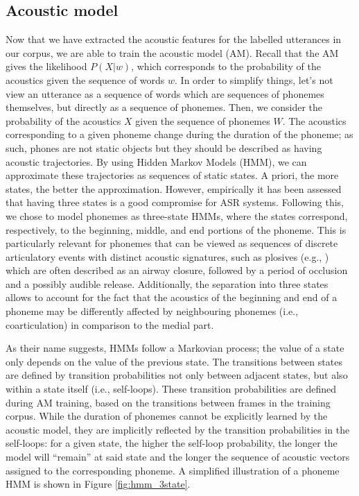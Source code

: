 \subsection{Acoustic model}

Now that we have extracted the acoustic features for the labelled utterances in our corpus, we are able to train the acoustic model (AM). Recall that the AM gives the likelihood $P(X|w)$, which corresponds to the probability of the acoustics given the sequence of words $w$.
In order to simplify things, let's not view an utterance as a sequence of words which are sequences of phonemes themselves, but directly as a sequence of phonemes. Then, we consider the probability of the acoustics $X$ given the sequence of phonemes $W$.
The acoustics corresponding to a given phoneme change during the duration of the phoneme; as such, phones are not static objects but they should be described as having acoustic trajectories. By using Hidden Markov Models (HMM), we can approximate these trajectories as sequences of static states. A priori, the more states, the better the approximation. However, empirically it has been assessed that having three states is a good compromise for ASR systems. Following this, we chose to model phonemes as three-state HMMs, where the states correspond, respectively, to the beginning, middle, and end portions of the phoneme. This is particularly relevant for phonemes that can be viewed as sequences of discrete articulatory events with distinct acoustic signatures, such as plosives (e.g., ) which are often described as an airway closure, followed by a period of occlusion and a possibly audible release. Additionally, the separation into three states allows to account for the fact that the acoustics of the beginning and end of a phoneme may be differently affected by neighbouring phonemes (i.e., coarticulation) in comparison to the medial part. 

As their name suggests, HMMs follow a Markovian process; the value of a state only depends on the value of the previous state. The transitions between states are defined by transition probabilities not only between adjacent states, but also within a state itself (i.e., self-loops). These transition probabilities are defined during AM training, based on the transitions between frames in the training corpus. While the duration of phonemes cannot be explicitly learned by the acoustic model, they are implicitly reflected by the transition probabilities in the self-loops: for a given state, the higher the self-loop probability, the longer the model will ``remain'' at said state and the longer the sequence of acoustic vectors assigned to the corresponding phoneme. A simplified illustration of a phoneme%
HMM is shown in Figure \ref{fig:hmm_3state}.

